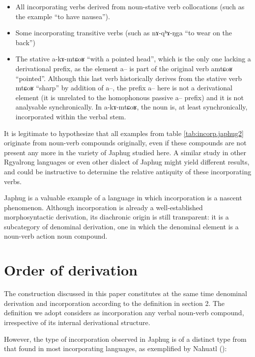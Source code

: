 \documentclass[oldfontcommands,oneside,a4paper,11pt]{article}
\newcommand{\ipa}[1]{{\phon #1}} %
\begin{document}
\begin{itemize}
\item All incorporating verbs derived from noun-stative verb collocations (such as the example ``to have nausea'').
\item Some incorporating transitive verbs (such as \ipa{nɤ-qʰɤ-ŋga} ``to wear on the back'')
\item The stative \ipa{a-kɤ-mtɕoʁ} ``with a pointed head'', which is the only one lacking a derivational prefix, as the element \ipa{a}-- is part of the original verb \ipa{amtɕoʁ} ``pointed''. Although this last verb historically derives from the stative verb \ipa{mtɕoʁ} ``sharp'' by addition of \ipa{a}--, the prefix \ipa{a}-- here is not a derivational element (it is unrelated to the homophonous passive \ipa{a}-- prefix) and it is not analysable synchronically. In \ipa{a-kɤ-mtɕoʁ}, the noun is, at least synchronically, incorporated within the verbal stem.

\end{itemize}
It is legitimate to hypothesize that all examples from table \ref{tab:incorp.japhug2} originate from noun-verb compounds originally, even if these compounds are not present any more in the variety of Japhug studied here. A similar study in other Rgyalrong languages or even other dialect of Japhug might yield different results, and could be instructive to determine the relative antiquity of these incorporating verbs.


Japhug is a valuable example of a language in which incorporation is a nascent phenomenon. Although incorporation is already a well-established morphosyntactic derivation, its diachronic origin is still transparent: it is a subcategory of denominal derivation, one in which the denominal element is a noun-verb action noun compound. 
 
 
\section{Order of derivation} \label{sec:order.deriv}
The construction discussed in this paper constitutes at the same time denominal derivation and incorporation according to the definition in section 2. The definition we adopt considers as incorporation any verbal noun-verb compound, irrespective of its internal derivational structure.

However, the type of incorporation observed in Japhug is of a distinct type from that found in most incorporating languages, as exemplified by Nahuatl  (\citealt[165-166]{launey80intro}):
\end{document}
